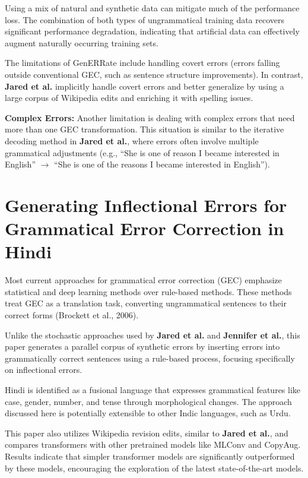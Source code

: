 \documentclass{article}
\begin{document}
Using a mix of natural and synthetic data can mitigate much of the performance loss. The combination of both types of ungrammatical training data recovers significant performance degradation, indicating that artificial data can effectively augment naturally occurring training sets.

The limitations of GenERRate include handling covert errors (errors falling outside conventional GEC, such as sentence structure improvements). In contrast, \textbf{Jared et al.} implicitly handle covert errors and better generalize by using a large corpus of Wikipedia edits and enriching it with spelling issues.

\textbf{Complex Errors:} Another limitation is dealing with complex errors that need more than one GEC transformation. This situation is similar to the iterative decoding method in \textbf{Jared et al.}, where errors often involve multiple grammatical adjustments (e.g., “She is one of reason I became interested in English” $\rightarrow$ “She is one of the reasons I became interested in English”).

\section{Generating Inflectional Errors for Grammatical Error Correction in Hindi}

Most current approaches for grammatical error correction (GEC) emphasize statistical and deep learning methods over rule-based methods. These methods treat GEC as a translation task, converting ungrammatical sentences to their correct forms (Brockett et al., 2006).

Unlike the stochastic approaches used by \textbf{Jared et al.} and \textbf{Jennifer et al.}, this paper generates a parallel corpus of synthetic errors by inserting errors into grammatically correct sentences using a rule-based process, focusing specifically on inflectional errors.

Hindi is identified as a fusional language that expresses grammatical features like case, gender, number, and tense through morphological changes. The approach discussed here is potentially extensible to other Indic languages, such as Urdu.

This paper also utilizes Wikipedia revision edits, similar to \textbf{Jared et al.}, and compares transformers with other pretrained models like MLConv and CopyAug. Results indicate that simpler transformer models are significantly outperformed by these models, encouraging the exploration of the latest state-of-the-art models.
\end{document}
